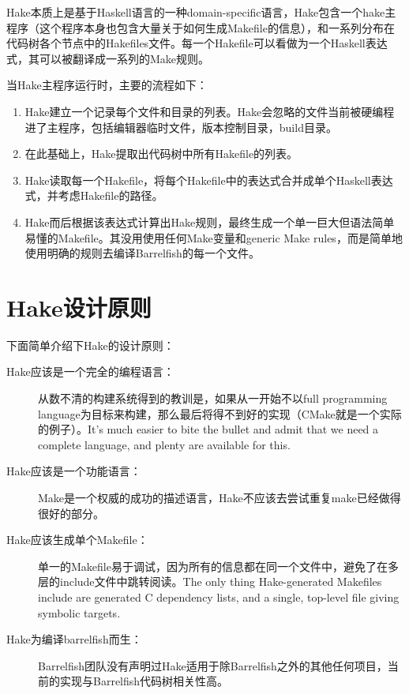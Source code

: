\documentclass[a4paper, 12pt]{report}
\begin{document}
    Hake本质上是基于Haskell语言的一种domain-specific语言，Hake包含一个hake主程序（这个程序本身也包含大量关于如何生成Makefile的信息），和一系列分布在代码树各个节点中的Hakefiles文件。每一个Hakefile可以看做为一个Haskell表达式，其可以被翻译成一系列的Make规则。
    
    当Hake主程序运行时，主要的流程如下：
    
    \begin{enumerate}
        \item Hake建立一个记录每个文件和目录的列表。Hake会忽略的文件当前被硬编程进了主程序，包括编辑器临时文件，版本控制目录，build目录。
        \item 在此基础上，Hake提取出代码树中所有Hakefile的列表。
        \item Hake读取每一个Hakefile，将每个Hakefile中的表达式合并成单个Haskell表达式，并考虑Hakefile的路径。
        \item Hake而后根据该表达式计算出Hake规则，最终生成一个单一巨大但语法简单易懂的Makefile。其没用使用任何Make变量和generic Make rules，而是简单地使用明确的规则去编译Barrelfish的每一个文件。
    \end{enumerate}
    
    \section{Hake设计原则}
    
    下面简单介绍下Hake的设计原则：
    
    \begin{description}
        \item [Hake应该是一个完全的编程语言：] 从数不清的构建系统得到的教训是，如果从一开始不以full programming language为目标来构建，那么最后将得不到好的实现（CMake就是一个实际的例子）。It's much easier to bite the bullet and admit that we need a complete language, and plenty are available for this.
        \item [Hake应该是一个功能语言：]Make是一个权威的成功的描述语言，Hake不应该去尝试重复make已经做得很好的部分。
        \item [Hake应该生成单个Makefile：]单一的Makefile易于调试，因为所有的信息都在同一个文件中，避免了在多层的include文件中跳转阅读。The only thing Hake-generated Makefiles include are generated C dependency lists, and a single, top-level file giving symbolic targets. 
        \item [Hake为编译barrelfish而生：] Barrelfish团队没有声明过Hake适用于除Barrelfish之外的其他任何项目，当前的实现与Barrelfish代码树相关性高。
    \end{description}
    
\end{document}

